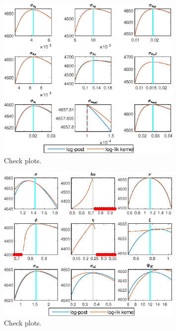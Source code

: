  
\begin{figure}[H]
\centering 
\includegraphics[width=0.80\textwidth]{BRS_sectoral_wo_fixed_cost/graphs/BRS_sectoral_wo_fixed_cost_CheckPlots1}
\caption{Check plots.}\label{Fig:CheckPlots:1}
\end{figure}
 
\begin{figure}[H]
\centering 
\includegraphics[width=0.80\textwidth]{BRS_sectoral_wo_fixed_cost/graphs/BRS_sectoral_wo_fixed_cost_CheckPlots2}
\caption{Check plots.}\label{Fig:CheckPlots:2}
\end{figure}
 

